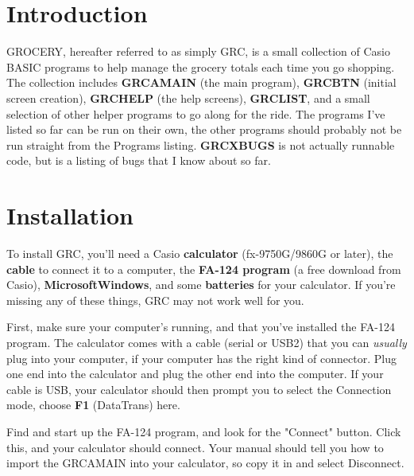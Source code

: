 \documentclass[]{article}
\begin{document}
\maketitle
	
\section{Introduction}

GROCERY, hereafter referred to as simply GRC, is a small collection of Casio BASIC programs
to help manage the grocery totals each time you go shopping. The collection includes {\bf GRCAMAIN} 
(the main program), {\bf GRCBTN} (initial screen creation), {\bf GRCHELP} (the help screens), {\bf GRCLIST},
and a small selection of other helper programs to go along for the ride. The programs I've listed so far
can be run on their own, the other programs should probably not be run straight from the Programs listing.
{\bf GRCXBUGS } is not actually runnable code, but is a listing of bugs that I know about so far.


\section{Installation}

To install GRC, you'll need a Casio {\bf calculator} (fx-9750G/9860G or later), the {\bf cable} to connect
it to a computer, the {\bf FA-124 program} (a free download from Casio), {\bf Microsoft\trade Windows\trade}, and
some {\bf batteries} for your calculator. If you're missing any of these things, GRC may not work well for you.

First, make sure your computer's running, and that you've installed the FA-124 program.
The calculator comes with a cable (serial or USB2) that you can { \it usually \/} plug
into your computer, if your computer has the right kind of connector. Plug one end into
the calculator and plug the other end into the computer. If your cable is USB, your calculator
should then prompt you to select the Connection mode, choose {\bf F1} (DataTrans) here.

Find and start up the FA-124 program, and look for the "Connect" button. Click this, and
your calculator should connect.
Your manual should tell you how to import the GRCAMAIN into your calculator, so copy it in
and select Disconnect.
\end{document}
